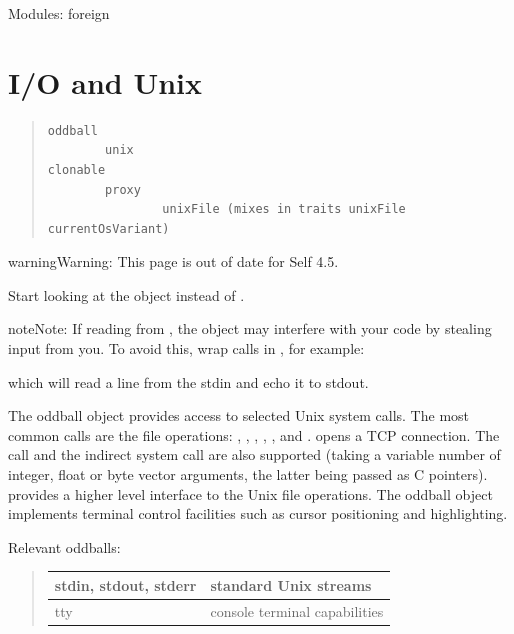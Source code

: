 \documentclass[letterpaper,10pt,english]{sphinxmanual}
\begin{document}
Modules: foreign


\section{I/O and Unix}
\label{unix:i-o-and-unix}\label{unix::doc}\begin{quote}

\begin{Verbatim}[commandchars=\\\{\}]
oddball
        unix
clonable
        proxy
                unixFile (mixes in traits unixFile currentOsVariant)
\end{Verbatim}
\end{quote}

\begin{notice}{warning}{Warning:}
This page is out of date for Self 4.5.

Start looking at the object  instead of .
\end{notice}

\begin{notice}{note}{Note:}
If reading from , the  object may interfere with your
code by stealing input from you.  To avoid this, wrap calls in
, for example:


which will read a line from the stdin and echo it to stdout.
\end{notice}

The oddball object  provides access to selected Unix system calls. The most common calls
are the file operations: , , , , ,  and .
 opens a TCP connection. The  call
and the indirect system call are also supported (taking a variable number of integer, float or byte
vector arguments, the latter being passed as C pointers).  provides a higher level interface
to the Unix file operations. The oddball object  implements terminal control facilities such
as cursor positioning and highlighting.

Relevant oddballs:
\begin{quote}

\begin{tabulary}{\linewidth}{|L|L|}
\hline

stdin, stdout, stderr
 & 
standard Unix streams
\\\hline

tty
 & 
console terminal capabilities
\\\hline
\end{tabulary}

\end{quote}
\end{document}
